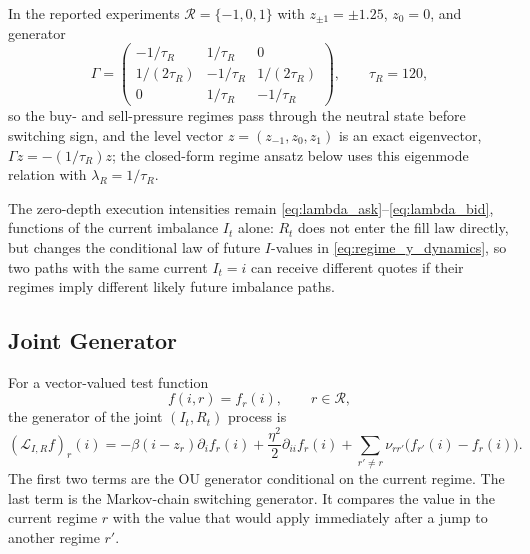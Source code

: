 \documentclass[11pt,a4paper]{article}
\theoremstyle{plain}
\theoremstyle{definition}
\begin{document}
In the reported experiments \(\mathcal R=\{-1,0,1\}\) with
\(z_{\pm1}=\pm1.25\), \(z_0=0\), and generator
\[
\Gamma
=
\begin{pmatrix}
-1/\tau_R & 1/\tau_R & 0\\
1/(2\tau_R) & -1/\tau_R & 1/(2\tau_R)\\
0 & 1/\tau_R & -1/\tau_R
\end{pmatrix},
\qquad
\tau_R=120,
\]
so the buy- and sell-pressure regimes pass through the neutral state before
switching sign, and the level vector \(z=(z_{-1},z_0,z_1)\) is an exact
eigenvector, \(\Gamma z=-(1/\tau_R)z\); the closed-form regime ansatz below
uses this eigenmode relation with \(\lambda_R=1/\tau_R\).

The zero-depth execution intensities remain
\eqref{eq:lambda_ask}--\eqref{eq:lambda_bid}, functions of the current
imbalance \(I_t\) alone: \(R_t\) does not enter the fill law directly, but
changes the conditional law of future \(I\)-values in
\eqref{eq:regime_y_dynamics}, so two paths with the same current \(I_t=i\) can
receive different quotes if their regimes imply different likely future
imbalance paths.

\subsection{Joint Generator}

For a vector-valued test function
\[
f(i,r)=f_r(i),
\qquad r\in\mathcal R,
\]
the generator of the joint \((I_t,R_t)\) process is
\begin{equation}
(\mathcal{L}_{I,R} f)_r(i)
=
-\beta(i-z_r)\partial_i f_r(i)
+\frac{\eta^2}{2}\partial_{ii} f_r(i)
+\sum_{r'\ne r}\nu_{rr'}\bigl(f_{r'}(i)-f_r(i)\bigr).
\label{eq:regime_joint_generator}
\end{equation}
The first two terms are the OU generator conditional on the current regime.
The last term is the Markov-chain switching generator.  It compares the value
in the current regime \(r\) with the value that would apply immediately after
a jump to another regime \(r'\).
\end{document}
